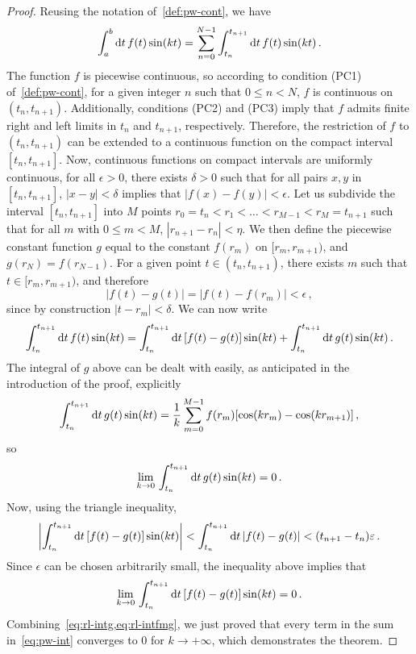 \begin{proof}
  Reusing the notation of~\cref{def:pw-cont}, we have
  \begin{equation}
    \int_a^b\mathrm{d} t\, f(t)\sin(kt)
    =\sum_{n=0}^{N-1}\int_{t_n}^{t_{n+1}}\mathrm{d} t\, f(t)\sin(kt)\,.
    \label{eq:pw-int}
  \end{equation}
  The function $f$ is piecewise continuous, so according to condition (PC1)
  of~\cref{def:pw-cont}, for a given integer $n$ such that $0\leq n<N$, $f$ is continuous
  on $(t_n,t_{n+1})$. Additionally, conditions (PC2) and (PC3) imply that $f$ admits
  finite right and left limits in $t_n$ and $t_{n+1}$, respectively. Therefore, the
  restriction of $f$ to $(t_n,t_{n+1})$ can be extended to a continuous function on the
  compact interval $[t_n,t_{n+1}]$. Now, continuous functions on compact intervals are
  uniformly continuous, \ie for all $\epsilon>0$, there exists $\delta>0$ such that for
  all pairs $x,y$ in $[t_n,t_{n+1}]$, $|x-y|<\delta$ implies that $|f(x)-f(y)|<\epsilon$.
  Let us subdivide the interval $[t_n,t_{n+1}]$ into $M$ points
  $r_0=t_n<r_1<\dots<r_{M-1}<r_M=t_{n+1}$ such that for all $m$ with $0\leq m<M$,
  $|r_{n+1}-r_n|<\eta$. We then define the piecewise constant function $g$ equal to the
  constant $f(r_m)$ on $[r_m,r_{m+1})$, and $g(r_N)=f(r_{N-1})$. For a given point
  $t\in(t_n,t_{n+1})$, there exists $m$ such that $t\in[r_m,r_{m+1})$, and therefore
  \begin{equation}
    |f(t)-g(t)|=|f(t)-f(r_m)|<\epsilon\,,
  \end{equation}
  since by construction $|t-r_m|<\delta$. We can now write
  \begin{equation}
    \int_{t_n}^{t_{n+1}}\mathrm{d} t\, f(t)\sin(kt)
    =\int_{t_n}^{t_{n+1}}\mathrm{d} t\, [f(t)-g(t)]\sin(kt)
    +\int_{t_n}^{t_{n+1}}\mathrm{d} t\,g(t)\sin(kt)\,.
  \end{equation}
  The integral of $g$ above can be dealt with easily, as anticipated in the introduction
  of the proof, explicitly
  \begin{equation}
    \int_{t_n}^{t_{n+1}}\mathrm{d} t\,g(t)\sin(kt)
    =\frac{1}{k}\sum_{m=0}^{M-1}f(r_m)[\cos(kr_m)-\cos(kr_{m+1})]\,,
  \end{equation}
  so
  \begin{equation}
    \lim_{k\to0}\,\int_{t_n}^{t_{n+1}}\mathrm{d} t\,g(t)\sin(kt)=0\,.
    \label{eq:rl-intg}
  \end{equation}
  Now, using the triangle inequality,
  \begin{equation}
    \left|\int_{t_n}^{t_{n+1}}\mathrm{d} t\, [f(t)-g(t)]\sin(kt)\right|<
    \int_{t_n}^{t_{n+1}}\mathrm{d} t\, |f(t)-g(t)|<(t_{n+1}-t_n)\varepsilon\,.
  \end{equation}
  Since $\epsilon$ can be chosen arbitrarily small, the inequality above implies that
  \begin{equation}
    \lim_{k\to0}\,\int_{t_n}^{t_{n+1}}\mathrm{d} t\, [f(t)-g(t)]\sin(kt)=0\,.
    \label{eq:rl-intfmg}
  \end{equation}
  Combining~\cref{eq:rl-intg,eq:rl-intfmg}, we just proved that every term in the sum
  in~\cref{eq:pw-int} converges to $0$ for $k\to+\infty$, which demonstrates the theorem.
\end{proof}
